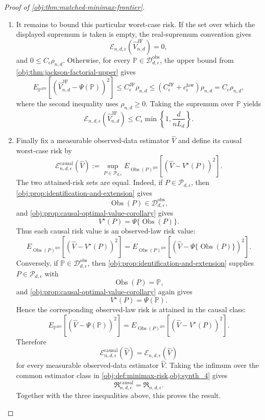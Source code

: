\documentclass[11pt]{article}
\begin{document}
\begin{proof}[Proof of \cref{obj:thm:matched-minimax-frontier}]
\begin{enumerate}
\item It remains to bound this particular worst-case risk.  If the set over which the displayed supremum is taken is empty, the real-supremum convention gives
\[
\mathcal E_{n,d,\epsilon}(\widehat V_{n,d}^{\mathrm{JF}})=0,
\]
and \(0\le C_\epsilon\rho_{n,d}\).  Otherwise, for every \(\mathbb P\in\mathcal D_{d,\epsilon}^{\mathrm{obs}}\), the upper bound from \cref{obj:thm:jackson-factorial-upper} gives
\[
E_{\mathbb P^{\otimes n}}
\left[
  \left(\widehat V_{n,d}^{\mathrm{JF}}-\Psi(\mathbb P)\right)^2
\right]
\le
C_{\epsilon}^{\mathrm{JF}}\rho_{n,d}
\le
(C_{\epsilon}^{\mathrm{JF}}+c_{\epsilon}^{\mathrm{low}})\rho_{n,d}
=
C_\epsilon\rho_{n,d},
\]
where the second inequality uses \(\rho_{n,d}\ge0\).  Taking the supremum over \(\mathbb P\) yields
\[
\mathcal E_{n,d,\epsilon}(\widehat V_{n,d}^{\mathrm{JF}})
\le
C_\epsilon
\min\left\{1,\frac{d}{nL_d}\right\}.
\]

\item Finally fix a measurable observed-data estimator \(\widehat V\) and define its causal worst-case risk by
\[
\mathcal E^{\mathrm{causal}}_{n,d,\epsilon}(\widehat V)
:=
\sup_{P\in\mathcal P_{d,\epsilon}}
E_{\operatorname{Obs}(P)^{\otimes n}}
\left[
  \left(\widehat V-V^\star(P)\right)^2
\right].
\]
The two attained-risk sets are equal.  Indeed, if \(P\in\mathcal P_{d,\epsilon}\), then \cref{obj:prop:identification-and-extension} gives
\[
\operatorname{Obs}(P)\in\mathcal D_{d,\epsilon}^{\mathrm{obs}},
\]
and \cref{obj:prop:causal-optimal-value-corollary} gives
\[
V^\star(P)=\Psi\{\operatorname{Obs}(P)\}.
\]
Thus each causal risk value is an observed-law risk value:
\[
E_{\operatorname{Obs}(P)^{\otimes n}}
\left[
  \left(\widehat V-V^\star(P)\right)^2
\right]
=
E_{\operatorname{Obs}(P)^{\otimes n}}
\left[
  \left(\widehat V-\Psi\{\operatorname{Obs}(P)\}\right)^2
\right].
\]
Conversely, if \(\mathbb P\in\mathcal D_{d,\epsilon}^{\mathrm{obs}}\), then \cref{obj:prop:identification-and-extension} supplies \(P\in\mathcal P_{d,\epsilon}\) with
\[
\operatorname{Obs}(P)=\mathbb P,
\]
and \cref{obj:prop:causal-optimal-value-corollary} again gives
\[
V^\star(P)=\Psi(\mathbb P).
\]
Hence the corresponding observed-law risk is attained in the causal class:
\[
E_{\mathbb P^{\otimes n}}
\left[
  \left(\widehat V-\Psi(\mathbb P)\right)^2
\right]
=
E_{\operatorname{Obs}(P)^{\otimes n}}
\left[
  \left(\widehat V-V^\star(P)\right)^2
\right].
\]
Therefore
\[
\mathcal E^{\mathrm{causal}}_{n,d,\epsilon}(\widehat V)
=
\mathcal E_{n,d,\epsilon}(\widehat V)
\]
for every measurable observed-data estimator \(\widehat V\).  Taking the infimum over the common estimator class in \cref{obj:def:minimax-risk,obj:synth_4} gives
\[
\mathfrak R^{\mathrm{causal}}_{n,d,\epsilon}
=
\mathfrak R_{n,d,\epsilon}.
\]
Together with the three inequalities above, this proves the result.
\end{enumerate}
\end{proof}
\end{document}
